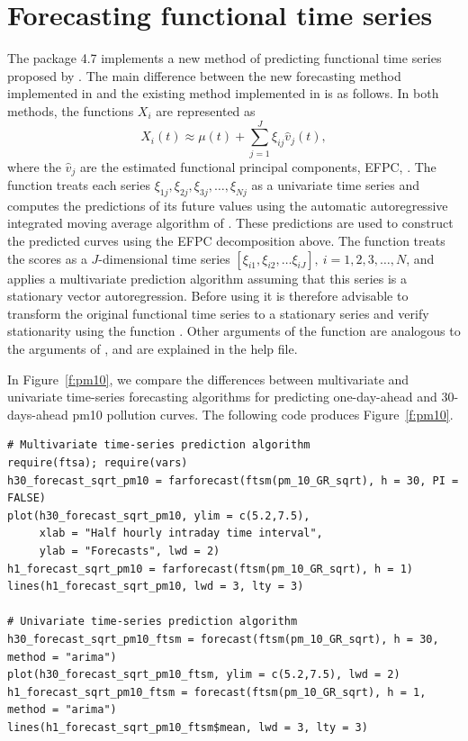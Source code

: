 \documentclass[nojss]{jss}
\begin{document}
\section{Forecasting functional time series}

The package  4.7 implements a new method of predicting functional time series proposed by \cite{ANH15}. The main difference between the new forecasting method implemented in  and the existing method implemented in  is as follows. In both methods, the functions $X_i$ are represented as
\begin{equation}
X_i(t) \approx  \mu(t) + \sum_{j=1}^J \xi_{ij} \hat v_j(t), 
\end{equation} 
where the $\hat v_j$ are the estimated functional principal components, EFPC, \citep[see e.g.,][Chapter 3]{HKbook}. The function  treats each series $\xi_{1j}, \xi_{2j}, \xi_{3j}, \ldots, \xi_{Nj}$ as a univariate time series and computes the predictions of its future values using the automatic autoregressive integrated moving average algorithm of \cite{HK08}. These predictions are used to construct the predicted curves using the EFPC decomposition above. The function  treats the scores as a $J$-dimensional  time series $[\xi_{i1}, \xi_{i2}, \ldots \xi_{iJ}], \ i=1,2,3, \ldots, N$, and applies a multivariate prediction algorithm assuming that this series is a stationary vector autoregression. Before using  it is therefore advisable to transform the original functional time series to a stationary series and verify stationarity using the function . Other arguments of the function  are analogous to the arguments of , and are explained in the help file. 

In Figure~\ref{f:pm10}, we compare the differences between multivariate and univariate time-series forecasting algorithms for predicting one-day-ahead and 30-days-ahead pm10 pollution curves. The following code produces Figure~\ref{f:pm10}. 
\begin{Verbatim}
# Multivariate time-series prediction algorithm
require(ftsa); require(vars)
h30_forecast_sqrt_pm10 = farforecast(ftsm(pm_10_GR_sqrt), h = 30, PI = FALSE)
plot(h30_forecast_sqrt_pm10, ylim = c(5.2,7.5), 
     xlab = "Half hourly intraday time interval",
     ylab = "Forecasts", lwd = 2)
h1_forecast_sqrt_pm10 = farforecast(ftsm(pm_10_GR_sqrt), h = 1)
lines(h1_forecast_sqrt_pm10, lwd = 3, lty = 3)

# Univariate time-series prediction algorithm
h30_forecast_sqrt_pm10_ftsm = forecast(ftsm(pm_10_GR_sqrt), h = 30, method = "arima")
plot(h30_forecast_sqrt_pm10_ftsm, ylim = c(5.2,7.5), lwd = 2)
h1_forecast_sqrt_pm10_ftsm = forecast(ftsm(pm_10_GR_sqrt), h = 1, method = "arima")
lines(h1_forecast_sqrt_pm10_ftsm$mean, lwd = 3, lty = 3)
\end{Verbatim}
\end{document}
